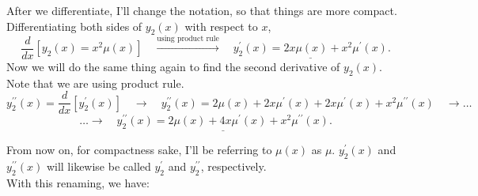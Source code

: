 \documentclass[a4paper,12pt]{article}
\begin{document}
 After we differentiate, I'll change the notation, so that things are more compact. Differentiating both sides of $y_2(x)$ with respect to $x$,
 $$ \frac{d}{dx}\left[y_2(x) = x^2\mu(x)\right] \quad\overset{\text{using product rule}}\rightarrow \quad \underline{y^{\prime}_2(x) = 2x\mu(x) + x^2\mu^{\prime}(x)}.$$
 Now we will do the same thing again to find the second derivative of $y_2(x)$. Note that we are using product rule.
 $$ y^{\prime \prime}_2(x) = \frac{d}{dx}[y^{\prime}_2(x)] \quad\rightarrow \quad y^{\prime \prime}_2(x) = 2\mu(x) + 2x\mu^{\prime}(x) + 2x\mu^{\prime}(x) + x^2\mu^{\prime \prime}(x) \quad\rightarrow \ldots $$
 $$\ldots\rightarrow \quad \underline{y^{\prime \prime}_2(x) = 2\mu(x) + 4x\mu^{\prime}(x) + x^2\mu^{\prime \prime}(x)}. $$
 
 From now on, for compactness sake, I'll be referring to $\mu(x)$ as $\mu$.  $y^{\prime}_2(x)$ and $y^{\prime \prime}_2(x)$ will likewise be called $y^{\prime}_2$ and $y^{\prime \prime}_2$, respectively.\\
 
 With this renaming, we have:
 
\end{document}
